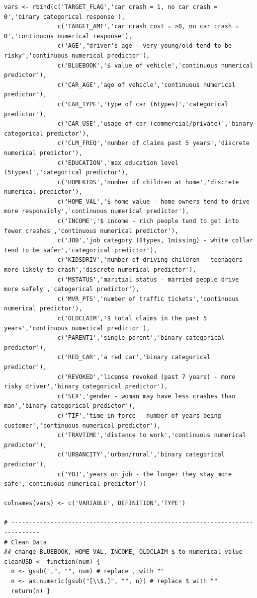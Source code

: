 \documentclass[]{article}
\begin{document}
\begin{verbatim}
vars <- rbind(c('TARGET_FLAG','car crash = 1, no car crash = 0','binary categorical response'),
               c('TARGET_AMT','car crash cost = >0, no car crash = 0','continuous numerical response'),
               c('AGE',"driver's age - very young/old tend to be risky",'continuous numerical predictor'),
               c('BLUEBOOK','$ value of vehicle','continuous numerical predictor'),
               c('CAR_AGE','age of vehicle','continuous numerical predictor'),
               c('CAR_TYPE','type of car (6types)','categorical predictor'),
               c('CAR_USE','usage of car (commercial/private)','binary categorical predictor'),
               c('CLM_FREQ','number of claims past 5 years','discrete numerical predictor'),
               c('EDUCATION','max education level (5types)','categorical predictor'),
               c('HOMEKIDS','number of children at home','discrete numerical predictor'),
               c('HOME_VAL','$ home value - home owners tend to drive more responsibly','continuous numerical predictor'),
               c('INCOME','$ income - rich people tend to get into fewer crashes','continuous numerical predictor'),
               c('JOB','job category (8types, 1missing) - white collar tend to be safer','categorical predictor'),
               c('KIDSDRIV','number of driving children - teenagers more likely to crash','discrete numerical predictor'),
               c('MSTATUS','maritial status - married people drive more safely','catogerical predictor'),
               c('MVR_PTS','number of traffic tickets','continuous numerical predictor'),
               c('OLDCLAIM','$ total claims in the past 5 years','continuous numerical predictor'),
               c('PARENT1','single parent','binary categorical predictor'),
               c('RED_CAR','a red car','binary categorical predictor'),
               c('REVOKED','license revoked (past 7 years) - more risky driver','binary categorical predictor'),
               c('SEX','gender - woman may have less crashes than man','binary categorical predictor'),
               c('TIF','time in force - number of years being customer','continuous numerical predictor'),
               c('TRAVTIME','distance to work','continuous numerical predictor'),
               c('URBANCITY','urban/rural','binary categorical predictor'),
               c('YOJ','years on job - the longer they stay more safe','continuous numerical predictor'))

colnames(vars) <- c('VARIABLE','DEFINITION','TYPE')

# ------------------------------------------------------------------------------
# Clean Data
## change BLUEBOOK, HOME_VAL, INCOME, OLDCLAIM $ to numerical value
cleanUSD <- function(num) {
  n <- gsub(",", "", num) # replace , with ""
  n <- as.numeric(gsub("[\\$,]", "", n)) # replace $ with ""
  return(n) }


\end{verbatim}
\end{document}
